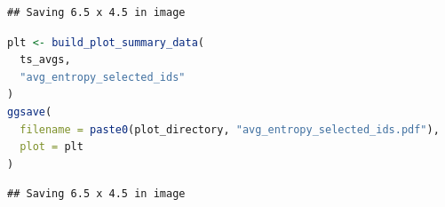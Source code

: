 \documentclass[
]{book}
\begin{document}
\begin{lstlisting}
## Saving 6.5 x 4.5 in image
\end{lstlisting}

\begin{lstlisting}[language=R]
plt <- build_plot_summary_data(
  ts_avgs,
  "avg_entropy_selected_ids"
)
ggsave(
  filename = paste0(plot_directory, "avg_entropy_selected_ids.pdf"),
  plot = plt
)
\end{lstlisting}

\begin{lstlisting}
## Saving 6.5 x 4.5 in image
\end{lstlisting}


  
\end{document}
